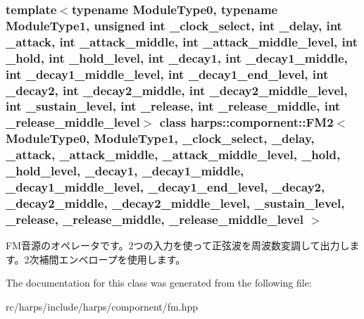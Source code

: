 \subsubsection*{template$<$typename ModuleType0, typename ModuleType1, unsigned int \_\-clock\_\-select, int \_\-delay, int \_\-attack, int \_\-attack\_\-middle, int \_\-attack\_\-middle\_\-level, int \_\-hold, int \_\-hold\_\-level, int \_\-decay1, int \_\-decay1\_\-middle, int \_\-decay1\_\-middle\_\-level, int \_\-decay1\_\-end\_\-level, int \_\-decay2, int \_\-decay2\_\-middle, int \_\-decay2\_\-middle\_\-level, int \_\-sustain\_\-level, int \_\-release, int \_\-release\_\-middle, int \_\-release\_\-middle\_\-level$>$ class harps::compornent::FM2$<$ ModuleType0, ModuleType1, \_\-clock\_\-select, \_\-delay, \_\-attack, \_\-attack\_\-middle, \_\-attack\_\-middle\_\-level, \_\-hold, \_\-hold\_\-level, \_\-decay1, \_\-decay1\_\-middle, \_\-decay1\_\-middle\_\-level, \_\-decay1\_\-end\_\-level, \_\-decay2, \_\-decay2\_\-middle, \_\-decay2\_\-middle\_\-level, \_\-sustain\_\-level, \_\-release, \_\-release\_\-middle, \_\-release\_\-middle\_\-level $>$}

FM音源のオペレータです。2つの入力を使って正弦波を周波数変調して出力します。2次補間エンベロープを使用します。 

The documentation for this class was generated from the following file:\begin{CompactItemize}
\item 
rc/harps/include/harps/compornent/fm.hpp\end{CompactItemize}
